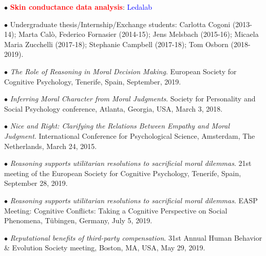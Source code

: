 \documentclass[10pt]{article}
\begin{document}
	$\bullet$ \textcolor{red}{\textbf{Skin conductance data analysis}}: \textcolor{blue}{Ledalab}
	
	
	
	$\bullet$ Undergraduate thesis/Internship/Exchange students: Carlotta Cogoni (2013-14); Marta Cal\`{o}, Federico \hspace*{0.1in}Fornasier (2014-15); Jens Melsbach (2015-16); Micaela Maria Zucchelli (2017-18); Stephanie Campbell \hspace*{0.1in}(2017-18); Tom Osborn (2018-2019).
	

	$\bullet$ \textit{The Role of Reasoning in Moral Decision Making}. European Society for Cognitive Psychology, Tenerife, \hspace*{0.1in}Spain, September, 2019.
    \miniskip
	
	$\bullet$ \textit{Inferring Moral Character from Moral Judgments}. Society for Personality and Social Psychology conference, \hspace*{0.1in}Atlanta, Georgia, USA, March 3, 2018.
	\miniskip
	
	$\bullet$ \textit{Nice and Right: Clarifying the Relations Between Empathy and Moral Judgment}. International Conference for \hspace*{0.1in}Psychological Science, Amsterdam, The Netherlands, March 24, 2015.
	\miniskip
	

	$\bullet$ \textit{Reasoning supports utilitarian resolutions to sacrificial moral dilemmas}. 21st meeting of the European \hspace*{0.1in}Society for Cognitive Psychology, Tenerife, Spain, September 28, 2019.\\
	\miniskip

	$\bullet$ \textit{Reasoning supports utilitarian resolutions to sacrificial moral dilemmas}. EASP Meeting: Cognitive Conflicts: \hspace*{0.1in}Taking a Cognitive Perspective on Social Phenomena, Tübingen, Germany, July 5, 2019.\\
	\miniskip

    $\bullet$ \textit{Reputational benefits of third-party compensation}. 31st Annual Human Behavior \& Evolution Society \hspace*{0.1in}meeting, Boston, MA, USA, May 29, 2019.\\
	\miniskip
\end{document}
